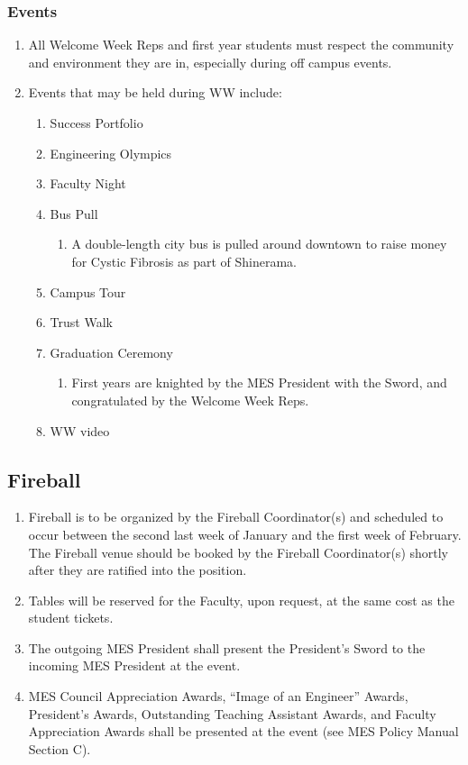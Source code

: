 \hypertarget{events}{%
 \subsubsection{Events}
 \label{events}}
\begin{enumerate}
 \item
  All Welcome Week Reps and first year students must respect the
  community and environment they are in, especially during off campus
  events.
 \item
  Events that may be held during WW include:

  \begin{enumerate}
   \item
    Success Portfolio
   \item
    Engineering Olympics
   \item
    Faculty Night
   \item
    Bus Pull

    \begin{enumerate}
     \item
      A double-length city bus is pulled around downtown to raise money
      for Cystic Fibrosis as part of Shinerama.
    \end{enumerate}
   \item
    Campus Tour
   \item
    Trust Walk
   \item
    Graduation Ceremony

    \begin{enumerate}
     \item
      First years are knighted by the MES President with the Sword, and
      congratulated by the Welcome Week Reps.
    \end{enumerate}
   \item
    WW video
  \end{enumerate}
\end{enumerate}

\hypertarget{fireball}{%
 \subsection{Fireball}
 \label{fireball}}
\begin{enumerate}
 \item
  Fireball is to be organized by the Fireball Coordinator(s) and
  scheduled to occur between the second last week of January and the
  first week of February. The Fireball venue should be booked by the
  Fireball Coordinator(s) shortly after they are ratified into the
  position.
 \item
  Tables will be reserved for the Faculty, upon request, at the same
  cost as the student tickets.
 \item
  The outgoing MES President shall present the President's Sword to the
  incoming MES President at the event.
 \item
  MES Council Appreciation Awards, ``Image of an Engineer'' Awards,
  President's Awards, Outstanding Teaching Assistant Awards, and Faculty
  Appreciation Awards shall be presented at the event (see MES Policy
  Manual Section C). %

\end{enumerate}

